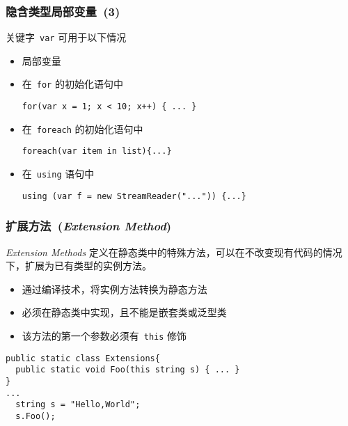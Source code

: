 \begin{frame}[fragile]
\frametitle{隐含类型局部变量~(3)}

关键字~\texttt{var} 可用于以下情况
\begin{itemize}[<+->]
\item 局部变量
\item 在~\texttt{for} 的初始化语句中
\begin{lstlisting}
for(var x = 1; x < 10; x++) { ... }
\end{lstlisting}
\item 在~\texttt{foreach} 的初始化语句中
\begin{lstlisting}
foreach(var item in list){...}
\end{lstlisting}
\item 在~\texttt{using} 语句中
\begin{lstlisting}
using (var f = new StreamReader("...")) {...}
\end{lstlisting}
\end{itemize}
\end{frame}


\begin{frame}[fragile]
\frametitle{扩展方法~(\textit{Extension Method})}
\begin{block}{\textit{Extension Methods}}
\CJKindent 定义在静态类中的特殊方法，可以在不改变现有代码的情况下，扩展为已有类型的实例方法。
\end{block}

\begin{itemize}
\item 通过编译技术，将实例方法转换为静态方法
\item 必须在静态类中实现，且不能是嵌套类或泛型类
\item 该方法的第一个参数必须有~\texttt{this} 修饰
\end{itemize}

\begin{lstlisting}
public static class Extensions{
  public static void Foo(this string s) { ... }
}
...
  string s = "Hello,World";
  s.Foo();
\end{lstlisting}
\end{frame}


